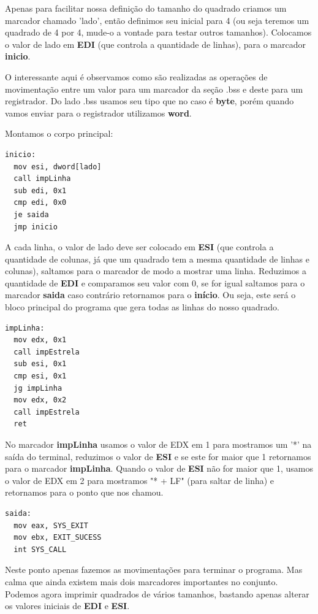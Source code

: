 Apenas para facilitar nossa definição do tamanho do quadrado criamos um marcador chamado 'lado', então definimos seu inicial para 4 (ou seja teremos um quadrado de 4 por 4, mude-o a vontade para testar outros tamanhos). Colocamos o valor de lado em \textbf{EDI} (que controla a quantidade de linhas), para o marcador \textbf{inicio}.

O interessante aqui é observamos como são realizadas as operações de movimentação entre um valor para um marcador da seção .bss e deste para um registrador. Do lado .bss usamos seu tipo que no caso é \textbf{byte}, porém quando vamos enviar para o registrador utilizamos \textbf{word}. 

Montamos o corpo principal:
\begin{lstlisting}[]
inicio:
  mov esi, dword[lado]
  call impLinha
  sub edi, 0x1
  cmp edi, 0x0
  je saida
  jmp inicio	
\end{lstlisting}

A cada linha, o valor de lado deve ser colocado em \textbf{ESI} (que controla a quantidade de colunas, já que um quadrado tem a mesma quantidade de linhas e colunas), saltamos para o marcador de modo a mostrar uma linha. Reduzimos a quantidade de \textbf{EDI} e comparamos seu valor com 0, se for igual saltamos para o marcador \textbf{saida} caso contrário retornamos para o \textbf{início}. Ou seja, este será o bloco principal do programa que gera todas as linhas do nosso quadrado.
\begin{lstlisting}[]
impLinha:
  mov edx, 0x1
  call impEstrela
  sub esi, 0x1
  cmp esi, 0x1
  jg impLinha
  mov edx, 0x2
  call impEstrela
  ret
\end{lstlisting}

No marcador \textbf{impLinha} usamos o valor de EDX em 1 para mostramos um '*' na saída do terminal, reduzimos o valor de \textbf{ESI} e se este for maior que 1 retornamos para o marcador \textbf{impLinha}. Quando o valor de \textbf{ESI} não for maior que 1, usamos o valor de EDX em 2 para mostramos "* + LF" (para saltar de linha) e retornamos para o ponto que nos chamou.
\begin{lstlisting}[]
saida:
  mov eax, SYS_EXIT
  mov ebx, EXIT_SUCESS
  int SYS_CALL	
\end{lstlisting}

Neste ponto apenas fazemos as movimentações para terminar o programa. Mas calma que ainda existem mais dois marcadores importantes no conjunto. Podemos agora imprimir quadrados de vários tamanhos, bastando apenas alterar os valores iniciais de \textbf{EDI} e \textbf{ESI}.

